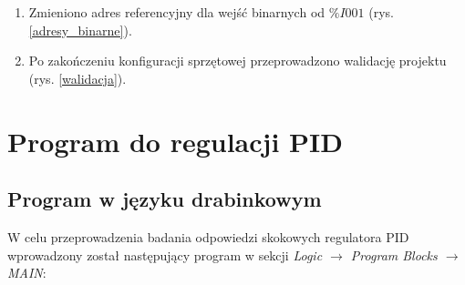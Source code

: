 \documentclass[12pt]{article}
\begin{document}
\begin{enumerate}
    \item Zmieniono adres referencyjny dla wejść binarnych od $\%I001$ (rys.\ref{adresy_binarne}).
    \item Po zakończeniu konfiguracji sprzętowej przeprowadzono walidację projektu (rys. \ref{walidacja}).
\end{enumerate}


\section{Program do regulacji PID}
\subsection{Program w języku drabinkowym}
W celu przeprowadzenia badania odpowiedzi skokowych regulatora PID wprowadzony został następujący program w sekcji \textit{Logic $\rightarrow$ Program Blocks $\rightarrow$ MAIN}:
\end{document}
